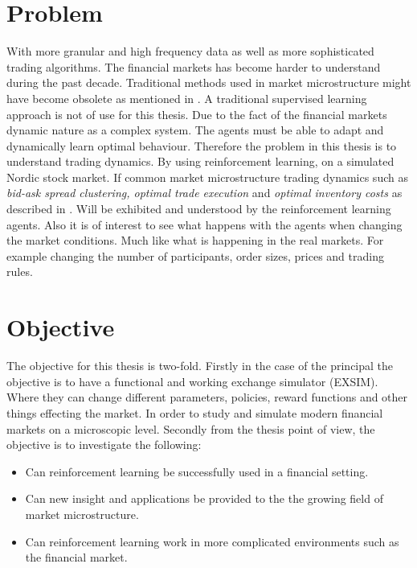 \documentclass{kththesis}
\theoremstyle{definition}
\begin{document}
\section{Problem}
With more granular and high frequency data as well as more sophisticated trading algorithms. The financial markets has become harder to understand during the past decade. Traditional methods used in market microstructure might have become obsolete as mentioned in \textcite{o2015high}. A traditional supervised learning approach is not of use for this thesis. Due to the fact of the financial markets dynamic nature as a complex system. The agents must be able to adapt and dynamically learn optimal behaviour.  Therefore the problem in this thesis is to understand trading dynamics. By using reinforcement learning, on a simulated Nordic stock market. 
\newline
\newline
If common market microstructure trading dynamics such as \textit{bid-ask spread clustering, optimal trade execution} and \textit{optimal inventory costs} as described in \textcite{o1995market}. Will be exhibited and understood by the reinforcement learning agents. Also it is of interest to see what happens with the agents when changing the market conditions. Much like what is happening in the real markets. For example changing the number of participants, order sizes, prices and trading rules.



\section{Objective}
The objective for this thesis is two-fold. Firstly in the case of the principal the objective is to have a functional and working exchange simulator (EXSIM). Where they can change different parameters, policies, reward functions and other things effecting the market. In order to study and simulate modern financial markets on a microscopic level. Secondly from the thesis point of view, the objective is to investigate the following:

\begin{itemize}
    \item Can reinforcement learning be successfully used in a financial setting. 
    \item Can new insight and applications be provided to the the growing field of market microstructure. 
    \item Can reinforcement learning work in more complicated environments such as the financial market.
\end{itemize}
\end{document}
